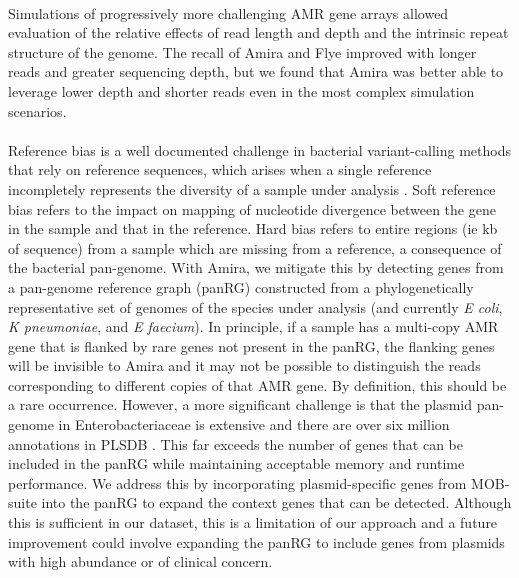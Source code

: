\paragraph{}
Simulations of progressively more challenging AMR gene arrays allowed evaluation of the relative effects of read length and depth and the intrinsic repeat structure of the genome. The recall of Amira and Flye improved with longer reads and greater sequencing depth, but we found that Amira was better able to leverage lower depth and shorter reads even in the most complex simulation scenarios.
\paragraph{}
Reference bias is a well documented challenge in bacterial variant-calling methods that rely on reference sequences, which arises when a single reference incompletely represents the diversity of a sample under analysis  \cite{pandora, 10.1016/s2666-52472100149-x, panaroo}. Soft reference bias refers to the impact on mapping of nucleotide divergence between the gene in the sample and that in the reference. Hard bias refers to entire regions (ie kb of sequence) from a sample which are missing from a reference, a consequence of the bacterial pan-genome. With Amira, we mitigate this by detecting genes from a pan-genome reference graph (panRG) constructed from a phylogenetically representative set of genomes of the species under analysis (and currently \textit{E coli}, \textit{K pneumoniae}, and \textit{E faecium}). In principle, if a sample has a multi-copy AMR gene that is flanked by rare genes not present in the panRG, the flanking genes will be invisible to Amira and it may not be possible to distinguish the reads corresponding to different copies of that AMR gene. By definition, this should be a rare occurrence. However, a more significant challenge is that the plasmid pan-genome in Enterobacteriaceae is extensive and there are over six million annotations in PLSDB \cite{10.1093/nar/gkab1111}. This far exceeds the number of genes that can be included in the panRG while maintaining acceptable memory and runtime performance. We address this by incorporating plasmid-specific genes from MOB-suite \cite{10.1099/mgen.0.000206} into the panRG to expand the context genes that can be detected. Although this is sufficient in our dataset, this is a limitation of our approach and a future improvement could involve expanding the panRG to include genes from plasmids with high abundance or of clinical concern. 
